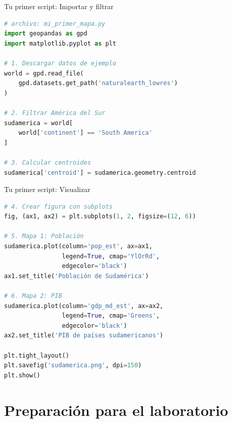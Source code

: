 \documentclass[10pt]{beamer}
\begin{document}
\begin{frame}[fragile]{Tu primer script: Importar y filtrar}
    \begin{lstlisting}[language=Python]
# archivo: mi_primer_mapa.py
import geopandas as gpd
import matplotlib.pyplot as plt

# 1. Descargar datos de ejemplo
world = gpd.read_file(
    gpd.datasets.get_path('naturalearth_lowres')
)

# 2. Filtrar América del Sur
sudamerica = world[
    world['continent'] == 'South America'
]

# 3. Calcular centroides
sudamerica['centroid'] = sudamerica.geometry.centroid
    \end{lstlisting}
\end{frame}

\begin{frame}[fragile]{Tu primer script: Visualizar}
    \begin{lstlisting}[language=Python]
# 4. Crear figura con subplots
fig, (ax1, ax2) = plt.subplots(1, 2, figsize=(12, 6))

# 5. Mapa 1: Población
sudamerica.plot(column='pop_est', ax=ax1, 
                legend=True, cmap='YlOrRd',
                edgecolor='black')
ax1.set_title('Población de Sudamérica')

# 6. Mapa 2: PIB  
sudamerica.plot(column='gdp_md_est', ax=ax2,
                legend=True, cmap='Greens',
                edgecolor='black')
ax2.set_title('PIB de países sudamericanos')

plt.tight_layout()
plt.savefig('sudamerica.png', dpi=150)
plt.show()
    \end{lstlisting}
\end{frame}

\section{Preparación para el laboratorio}
\end{document}
